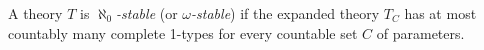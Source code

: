 A theory $T$ is \textit{$\aleph_0$-stable} (or \textit{$\omega$-stable}) if the expanded theory $T_C$ has at most countably many complete 1-types for every countable set $C$ of parameters.
